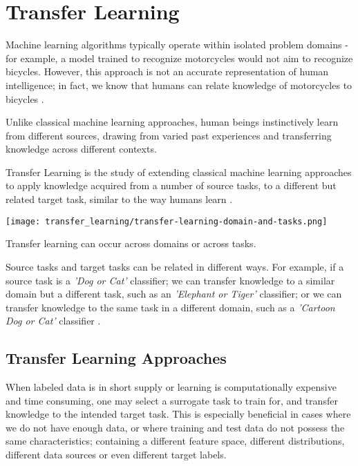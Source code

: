 \chapter[Transfer Learning]{Transfer Learning}
\label{ch:transfer-learning}

Machine learning algorithms typically operate within isolated problem domains - for example, a model trained to recognize motorcycles would not aim to recognize bicycles. However, this approach is not an accurate representation of human intelligence; in fact, we know that humans can relate knowledge of motorcycles to bicycles \citep{aytar2011}. 

Unlike classical machine learning approaches, human beings instinctively learn from different sources, drawing from varied past experiences and transferring knowledge across different contexts. 

Transfer Learning is the study of extending classical machine learning approaches to apply knowledge acquired from a number of source tasks, to a different but related target task, similar to the way humans learn \citep{thrunpratt1998}. 

\begin{marginfigure}
  \texttt{[image: transfer\_learning/transfer-learning-domain-and-tasks.png]}
  \caption{Transfer learning can occur across domains or across tasks.}
  \label{fig:transferlearning_domaintask}
\end{marginfigure}



Source tasks and target tasks can be related in different ways. For example, if a source task is a \textit{'Dog or Cat'} classifier; we can transfer knowledge to a similar domain but a different task, such as an \textit{'Elephant or Tiger'} classifier; or we can transfer knowledge to the same task in a different domain, such as a \textit{'Cartoon Dog or Cat'} classifier \citep{torrey2009}. 


\section{Transfer Learning Approaches}\label{sec:transfer-learning-approaches}

When labeled data is in short supply or learning is computationally expensive and time consuming, one may select a surrogate task to train for, and transfer knowledge to the intended target task.  This is especially beneficial in cases where we do not have enough data, or where training and test data do not possess the same characteristics; containing a different feature space, different distributions, different data sources or even different target labels. 

